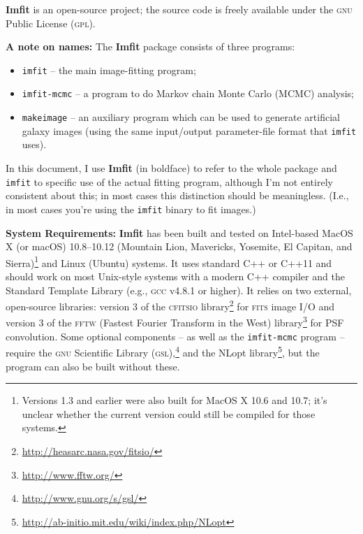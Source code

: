 \documentclass[10pt,a4paper,article]{memoir}
\newcommand{\imfit}{\textbf{Imfit}}
\newcommand{\Imfit}{\textbf{Imfit}}
\newcommand{\imfitprog}{\texttt{imfit}}
\newcommand{\imfitmcmc}{\texttt{imfit-mcmc}}
\newcommand{\makeimage}{\texttt{makeimage}}
\begin{document}

\Imfit{} is an open-source project; the source code is freely available
under the \textsc{gnu} Public License (\textsc{gpl}).


\bigskip

\textbf{A note on names:} The \imfit{} package consists of three programs:
\begin{itemize}
\item \imfitprog{} -- the main image-fitting program; \\
\item \imfitmcmc{} -- a program to do Markov chain Monte Carlo (MCMC) analysis; \\
\item \makeimage{} -- an auxiliary program which can be used to
generate artificial galaxy images (using the same input/output
parameter-file format that \imfitprog{} uses). \\
\end{itemize}
In this document, I use \imfit{} (in boldface) to refer to the whole
package and \imfitprog{} to specific use of the actual fitting program,
although I'm not entirely consistent about this; in most cases this
distinction should be meaningless. (I.e., in most cases you're using the
\imfitprog{} binary to fit images.)


\bigskip

\textbf{System Requirements:} \Imfit{} has been built and tested on
Intel-based MacOS X (or macOS) 10.8--10.12 (Mountain
Lion, Mavericks, Yosemite, El Capitan, and Sierra)\footnote{Versions 1.3
and earlier were also built for MacOS X 10.6 and 10.7; it's unclear
whether the current version could still be compiled for those systems.}
and Linux (Ubuntu) systems. It uses standard C++ or C++11 and should
work on most Unix-style systems with a modern C++ compiler and the
Standard Template Library (e.g., \textsc{gcc} v4.8.1 or higher). It
relies on two external, open-source libraries: version 3 of the
\textsc{cfitsio} library\footnote{\url{http://heasarc.nasa.gov/fitsio/}}
for \textsc{fits} image I/O and version 3 of the \textsc{fftw} (Fastest
Fourier Transform in the West)
library\footnote{\url{http://www.fftw.org/}} for PSF convolution. Some
optional components -- as well as the \imfitmcmc{} program -- require
the \textsc{gnu} Scientific Library
(\textsc{gsl}),\footnote{\url{http://www.gnu.org/s/gsl/}} and the NLopt
library\footnote{\url{http://ab-initio.mit.edu/wiki/index.php/NLopt}},
but the program can also be built without these.
\end{document}
